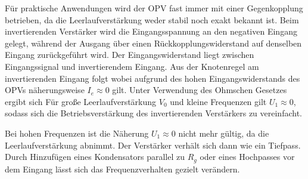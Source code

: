 Für praktische Anwendungen wird der OPV fast immer mit einer Gegenkopplung betrieben, da die Leerlaufverstärkung weder stabil noch exakt bekannt ist. Beim invertierenden Verstärker wird die Eingangsspannung an den negativen Eingang gelegt, während der Ausgang über einen Rückkopplungswiderstand 
auf denselben Eingang zurückgeführt wird. Der Eingangswiderstand 
liegt zwischen Eingangssignal und invertierendem Eingang.
Aus der Knotenregel am invertierenden Eingang folgt
wobei aufgrund des hohen Eingangswiderstands des OPVs näherungsweise $I_e \approx 0$ gilt. Unter Verwendung des Ohmschen Gesetzes ergibt sich
Für große Leerlaufverstärkung $V_0$ und kleine Frequenzen gilt $U_1 \approx 0$, sodass sich die Betriebsverstärkung des invertierenden Verstärkers zu
vereinfacht. 

Bei hohen Frequenzen ist die Näherung $U_1 \approx 0$ nicht mehr gültig, da die Leerlaufverstärkung abnimmt. Der Verstärker verhält sich dann wie ein Tiefpass. Durch Hinzufügen eines Kondensators parallel zu $R_g$ oder eines Hochpasses vor dem Eingang lässt sich das Frequenzverhalten gezielt verändern.